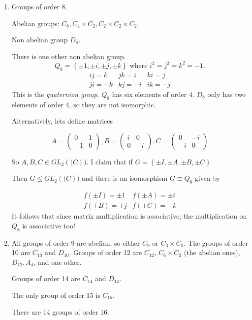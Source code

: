\documentclass{article}
\theoremstyle{definition} \newtheorem*{definition}{Definition}
\begin{document}
\begin{enumerate}
\item Groups of order 8.

  Abelian groups: $C_8,C_4\times C_2, C_2 \times C_2 \times C_2.$ 

  Non abelian group $D_8$.

  There is one other non abelian group.  \begin{equation*} Q_8 = \left\{ \pm1,
    \pm i, \pm j, \pm k \right\} \text{ where } i^2=j^2=k^2=-1.  \label{}
  \end{equation*} \begin{equation*} \begin{matrix} ij=k & jk=i & ki=j \\ ji=-k
      & kj=-i & ik=-j \end{matrix} \end{equation*} This is the \emph{quaternion
  group}.  $Q_8$ has six elements of order 4.  $D_8$ only has two elements of
  order 4, so they are not isomorphic.

  Alternatively, lets define matrices

  \begin{equation*} A = \left( \begin{matrix} 0 & 1 \\ -1 & 0 \end{matrix}
    \right), B = \left( \begin{matrix} i & 0 \\ 0 & -i \end{matrix} \right), C
    = \left( \begin{matrix} 0 & -i \\ -i & 0 \end{matrix} \right) \label{}
  \end{equation*}

  So $A,B,C \in GL_2(\mathbb(C))$. I claim that if $G = \left\{ \pm I, \pm A,
  \pm B, \pm C \right\}$

  Then $G \leq GL_2(\mathbb(C))$ and there is an isomorphism $G \equiv Q_8$
  given by 

  \begin{equation*} \begin{matrix} f(\pm I ) = \pm 1 & f(\pm A) = \pm i \\
      f(\pm B ) = \pm j & f(\pm C ) = \pm k \end{matrix} \label{}
  \end{equation*} It follows that since matrix multiplication is associative,
  the multiplication on $Q_8$ is associative too!

\item All groups of order 9 are abelian, so either $C_9$ or $C_3 \times C_3$.
  The groups of order 10 are $C_{10}$ and $D_{10}$. Groups of order 12 are
  $C_{12}$, $ C_{6} \times C_2$ (the abelian ones), $D_{12},A_{4}$, and one
  other. 

  Groups of order 14 are $C_{14}$ and $D_{14}$. 

  The only group of order 15 is $C_{15}$.

  There are 14 groups of order 16.  \end{enumerate}
\end{document}
